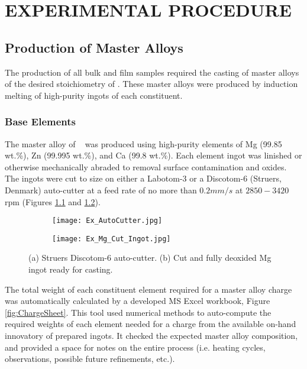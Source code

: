 \graphicspath{{./Z_images/Method_Images/}}

\chapter{EXPERIMENTAL PROCEDURE}

\section{Production of Master Alloys}
The production of all bulk and film samples required the casting of master alloys of the desired stoichiometry of \MgZnCa. These master alloys were produced by induction melting of high-purity ingots of each constituent.

\subsection{Base Elements}
The master alloy of \MgZnCa~ was produced using high-purity elements of Mg (99.85 wt.\%), Zn (99.995 wt.\%), and Ca (99.8 wt.\%). Each element ingot was linished or otherwise mechanically abraded to removal surface contamination and oxides. The ingots were cut to size on either a Labotom-3 or a Discotom-6 (Struers, Denmark) auto-cutter at a feed rate of no more than $0.2 mm/s$ at $2850 - 3420$ \acrshort{rpm} (Figures \ref{fig:AutoCutter} and \ref{fig:MgIngot}).

\begin{figure}[htbp]
	\centering
	\begin{subfigure}[htbp]{0.49\textwidth}
		\texttt{[image: Ex\_AutoCutter.jpg]}
		\caption{}
		\label{fig:AutoCutter}
	\end{subfigure}
	\begin{subfigure}[htbp]{0.30\textwidth}
		\texttt{[image: Ex\_Mg\_Cut\_Ingot.jpg]}
		\caption{}
		\label{fig:MgIngot}
	\end{subfigure}
	\caption{(a) Struers Discotom-6 auto-cutter. (b) Cut and fully deoxided Mg ingot ready for casting.}%
	\label{fig:Cutter_MgIngot}
\end{figure}

The total weight of each constituent element required for a master alloy charge was automatically calculated by a developed MS Excel workbook, Figure \ref{fig:ChargeSheet}. This tool used numerical methods to auto-compute the required weights of each element needed for a charge from the available on-hand innovatory of prepared ingots. It checked the expected master alloy composition, and provided a space for notes on the entire process (i.e. heating cycles, observations, possible future refinements, etc.).

